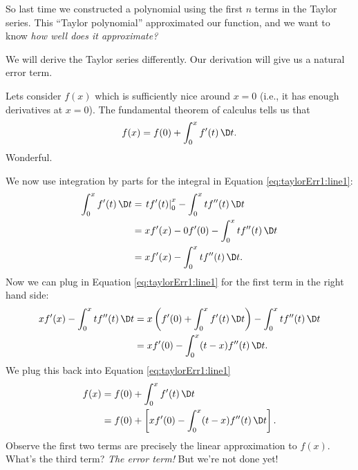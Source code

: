 
\M
So last time we constructed a polynomial using the first $n$
terms in the Taylor series. This ``Taylor polynomial''
approximated our function, and we want to know \emph{how well does it approximate?}

We will derive the Taylor series differently. Our derivation will
give us a natural error term. \more{}

 Lets consider $f(x)$ which is sufficiently nice around
$x=0$ (i.e., it has enough derivatives at $x=0$). The fundamental
theorem of calculus tells us that
\begin{equation}\label{eq:taylorErr1:line1}
f(x) = f(0) + \int^{x}_{0}f'(t)\,\D t.
\end{equation}
Wonderful.

We now use integration by parts for the integral in Equation \eqref{eq:taylorErr1:line1}:
\begin{equation}
\begin{aligned}
\int^{x}_{0}f'(t)\,\D t &=
\left.tf'(t)\right|^{x}_{0}-\int^{x}_{0}tf''(t)\,\D t\\
&= xf'(x)-0f'(0) - \int^{x}_{0}tf''(t)\,\D t\\
&= xf'(x) - \int^{x}_{0}tf''(t)\,\D t.
\end{aligned}
\end{equation}
Now we can plug in Equation \eqref{eq:taylorErr1:line1} for the
first term in the right hand side:
\begin{equation}
\begin{aligned}
xf'(x) - \int^{x}_{0}tf''(t)\,\D t &=
x\left(f'(0)+\int^{x}_{0}f'(t)\,\D t\right) - \int^{x}_{0}tf''(t)\,\D t\\
&= xf'(0) - \int^{x}_{0}(t-x)f''(t)\,\D t.
\end{aligned}
\end{equation}
We plug this back into Equation \eqref{eq:taylorErr1:line1}
\begin{equation}
\begin{aligned}
f(x) &= f(0) + \int^{x}_{0}f'(t)\,\D t\\
&= f(0) +\left[ xf'(0) - \int^{x}_{0}(t-x)f''(t)\,\D t\right].
\end{aligned}
\end{equation}
Observe the first two terms are precisely the linear
approximation to $f(x)$. What's the third term? \emph{The error term!}
But we're not done yet!

